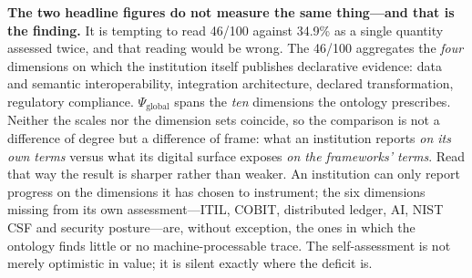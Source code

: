 \documentclass[engproc,proceedingpaper,submit,moreauthors]{Definitions/mdpi}
\begin{document}
\textbf{The two headline figures do not measure the same thing---and that is the finding.} It is tempting to read 46/100 against 34.9\% as a single quantity assessed twice, and that reading would be wrong. The 46/100 aggregates the \emph{four} dimensions on which the institution itself publishes declarative evidence: data and semantic interoperability, integration architecture, declared transformation, regulatory compliance. $\Psi_{\mathrm{global}}$ spans the \emph{ten} dimensions the ontology prescribes. Neither the scales nor the dimension sets coincide, so the comparison is not a difference of degree but a difference of frame: what an institution reports \emph{on its own terms} versus what its digital surface exposes \emph{on the frameworks' terms}. Read that way the result is sharper rather than weaker. An institution can only report progress on the dimensions it has chosen to instrument; the six dimensions missing from its own assessment---ITIL, COBIT, distributed ledger, AI, NIST CSF and security posture---are, without exception, the ones in which the ontology finds little or no machine-processable trace. The self-assessment is not merely optimistic in value; it is silent exactly where the deficit is.
\end{document}

